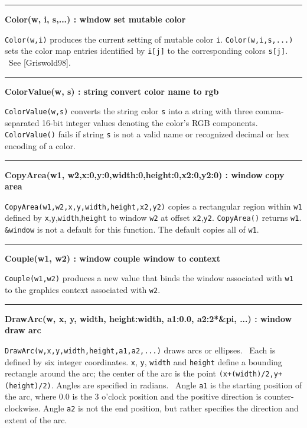 \bigskip\hrule\vspace{0.1cm}
\noindent
{\bf Color(w, i, s,...) : window } \hfill {\bf set mutable color}

\noindent
\texttt{Color(w,i)} produces the current setting of mutable color
\texttt{i}. \texttt{Color(w,i,s,...)} sets the color map entries
identified by \texttt{i[j]} to the corresponding colors \texttt{s[j]}.
\ See [Griswold98].

\bigskip\hrule\vspace{0.1cm}
\noindent
{\bf ColorValue(w, s) : string } \hfill {\bf convert color name to rgb}

\noindent
\texttt{ColorValue(w,s)} converts the string color \texttt{s} into a
string with three comma-separated 16-bit integer values denoting the
color's RGB components. \texttt{ColorValue()} fails if
string \texttt{s} is not a valid name or recognized decimal or hex
encoding of a color.

\bigskip\hrule\vspace{0.1cm}
\noindent
{\bf CopyArea(w1, w2,x:0,y:0,width:0,height:0,x2:0,y2:0) : window } \hfill {\bf copy area}

\noindent
\texttt{CopyArea(w1,w2,x,y,width,height,x2,y2)} copies a rectangular
region within \texttt{w1} defined by
\texttt{x},\texttt{y},\texttt{width},\texttt{height} to window
\texttt{w2} at offset \texttt{x2},\texttt{y2}. \texttt{CopyArea()}
returns \texttt{w1}. \texttt{\&window} is not a default for this
function. The default copies all of \texttt{w1}.

\bigskip\hrule\vspace{0.1cm}
\noindent
{\bf Couple(w1, w2) : window } \hfill {\bf couple window to context}

\noindent
\texttt{Couple(w1,w2)} produces a new value that binds the window
associated with \texttt{w1} to the graphics context associated with
\texttt{w2}.

\bigskip\hrule\vspace{0.1cm}
\noindent
{\bf DrawArc(w, x, y, width, height:width, a1:0.0, a2:2*\&pi, ...) : window } \hfill {\bf draw arc}

\noindent
\texttt{DrawArc(w,x,y,width,height,a1,a2,...)} draws arcs or ellipses.
\ Each is defined by six integer coordinates. \texttt{x}, \texttt{y},
\texttt{width} and \texttt{height} define a bounding rectangle around
the arc; the center of the arc is the point
\texttt{(x+(width)/2,y+(height)/2)}. Angles are specified in radians.
\ Angle \texttt{a1} is the starting position of the arc, where 0.0 is
the 3 o'clock position and the positive direction is
counter-clockwise. Angle \texttt{a2} is not the end position, but
rather specifies the direction and extent of the arc.

